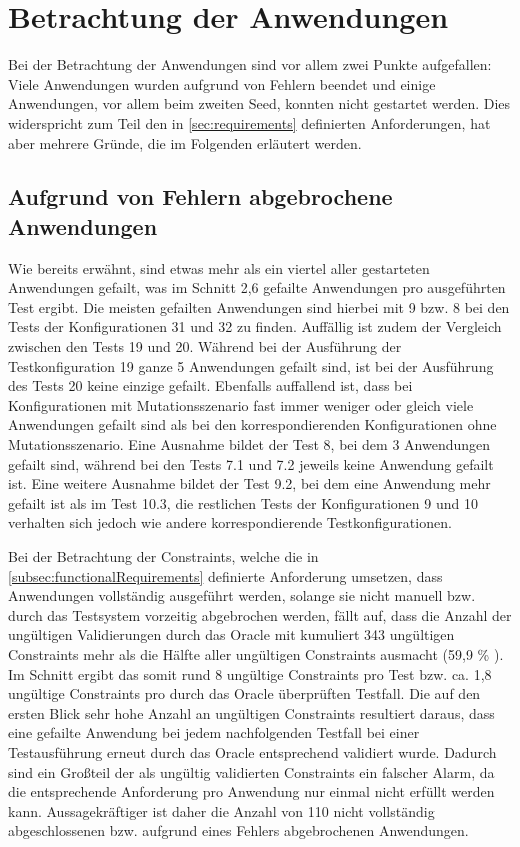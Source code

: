 \section{Betrachtung der Anwendungen}
\label{sec:appEval}

Bei der Betrachtung der Anwendungen sind vor allem zwei Punkte aufgefallen:
Viele Anwendungen wurden aufgrund von Fehlern beendet und einige Anwendungen, vor allem beim zweiten Seed, konnten nicht gestartet werden.
Dies widerspricht zum Teil den in \cref{sec:requirements} definierten Anforderungen, hat aber mehrere Gründe, die im Folgenden erläutert werden.

\subsection{Aufgrund von Fehlern abgebrochene Anwendungen}
\label{subsec:failedApps}

Wie bereits erwähnt, sind etwas mehr als ein viertel aller gestarteten Anwendungen gefailt, was im Schnitt 2,6 gefailte Anwendungen pro ausgeführten Test ergibt.
Die meisten gefailten Anwendungen sind hierbei mit 9 bzw. 8 bei den Tests der Konfigurationen 31 und 32 zu finden.
Auffällig ist zudem der Vergleich zwischen den Tests 19 und 20.
Während bei der Ausführung der Testkonfiguration 19 ganze 5 Anwendungen gefailt sind, ist bei der Ausführung des Tests 20 keine einzige gefailt.
Ebenfalls auffallend ist, dass bei Konfigurationen mit Mutationsszenario fast immer weniger oder gleich viele Anwendungen gefailt sind als bei den korrespondierenden Konfigurationen ohne Mutationsszenario.
Eine Ausnahme bildet der Test 8, bei dem 3 Anwendungen gefailt sind, während bei den Tests 7.1 und 7.2 jeweils keine Anwendung gefailt ist.
Eine weitere Ausnahme bildet der Test 9.2, bei dem eine Anwendung mehr gefailt ist als im Test 10.3, die restlichen Tests der Konfigurationen 9 und 10 verhalten sich jedoch wie andere korrespondierende Testkonfigurationen.

Bei der Betrachtung der Constraints, welche die in \cref{subsec:functionalRequirements} definierte Anforderung umsetzen, dass Anwendungen vollständig ausgeführt werden, solange sie nicht manuell bzw. durch das Testsystem vorzeitig abgebrochen werden, fällt auf, dass die Anzahl der ungültigen Validierungen durch das Oracle mit kumuliert 343 ungültigen Constraints mehr als die Hälfte aller ungültigen Constraints ausmacht (59,9 \% ).
Im Schnitt ergibt das somit rund 8 ungültige Constraints pro Test bzw. ca. 1,8 ungültige Constraints pro durch das Oracle überprüften Testfall.
Die auf den ersten Blick sehr hohe Anzahl an ungültigen Constraints resultiert daraus, dass eine gefailte Anwendung bei jedem nachfolgenden Testfall bei einer Testausführung erneut durch das Oracle entsprechend validiert wurde.
Dadurch sind ein Großteil der als ungültig validierten Constraints ein falscher Alarm, da die entsprechende Anforderung pro Anwendung nur einmal nicht erfüllt werden kann.
Aussagekräftiger ist daher die Anzahl von 110 nicht vollständig abgeschlossenen bzw. aufgrund eines Fehlers abgebrochenen Anwendungen.

